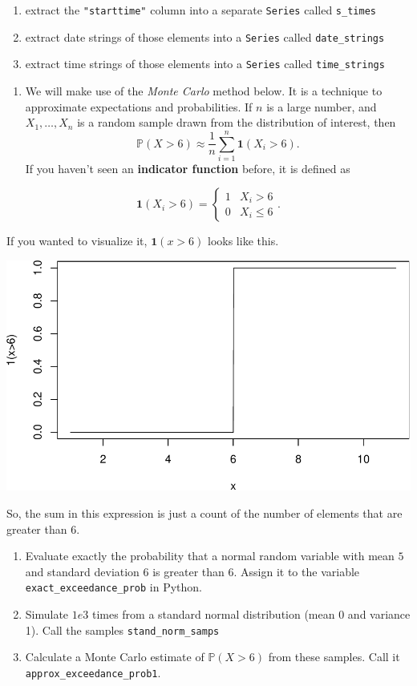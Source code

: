 \documentclass[
  12pt,
  krantz2]{krantz}
\providecommand{\tightlist}{%
  \setlength{\itemsep}{0pt}\setlength{\parskip}{0pt}}
\begin{document}
\begin{enumerate}
\def\labelenumi{\alph{enumi}.}
\item
  extract the \texttt{"starttime"} column into a separate \texttt{Series} called \texttt{s\_times}
\item
  extract date strings of those elements into a \texttt{Series} called \texttt{date\_strings}
\item
  extract time strings of those elements into a \texttt{Series} called \texttt{time\_strings}
\end{enumerate}

\begin{enumerate}
\def\labelenumi{\arabic{enumi}.}
\setcounter{enumi}{2}
\tightlist
\item
  We will make use of the \emph{Monte Carlo} \citep{monte-carlo-stat-methods} method below. It is a technique to approximate expectations and probabilities. If \(n\) is a large number, and \(X_1, \ldots, X_n\) is a random sample drawn from the distribution of interest, then
  \[
  \mathbb{P}(X > 6) \approx \frac{1}{n}\sum_{i=1}^n \mathbf{1}(X_i > 6).
  \]
  If you haven't seen an \textbf{indicator function} before, it is defined as
\end{enumerate}

\[
\mathbf{1}(X_i > 6)
=
\begin{cases}
1 & X_i > 6 \\
0 & X_i \le 6
\end{cases}.
\]

If you wanted to visualize it, \(\mathbf{1}(x > 6)\) looks like this.

\begin{center}\includegraphics[width=0.5\linewidth]{r_and_python_book_files/figure-latex/unnamed-chunk-47-1} \end{center}

So, the sum in this expression is just a count of the number of elements that are greater than \(6\).

\begin{enumerate}
\def\labelenumi{\alph{enumi}.}
\item
  Evaluate exactly the probability that a normal random variable with mean \(5\) and standard deviation \(6\) is greater than \(6\). Assign it to the variable \texttt{exact\_exceedance\_prob} in Python.
\item
  Simulate \(1e3\) times from a standard normal distribution (mean 0 and variance 1). Call the samples \texttt{stand\_norm\_samps}
\item
  Calculate a Monte Carlo estimate of \(\mathbb{P}(X > 6)\) from these samples. Call it \texttt{approx\_exceedance\_prob1}.
\end{enumerate}
\end{document}
